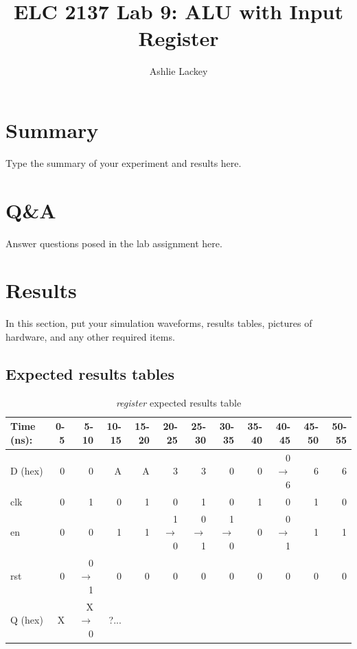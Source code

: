 \documentclass[11pt]{article}
\begin{document}
\title{ELC 2137 Lab 9: ALU with Input Register}
\author{Ashlie Lackey}

\maketitle


\section*{Summary}

Type the summary of your experiment and results here.  


\section*{Q\&A}

Answer questions posed in the lab assignment here.


\section*{Results}

In this section, put your simulation waveforms, results tables, pictures of hardware, and any other required items.

\subsection*{Expected results tables}
\begin{table}[ht]\centering
	\caption{\textit{register} expected results table}
	\label{ALU:tbl:register_ERT}\medskip
	\begin{tabular}{l|rrrrrrrrrrr}
		Time (ns): & 0-5 & 5-10 & 10-15 & 15-20 & 20-25 & 25-30 & 30-35 & 35-40& 40-45 & 45-50 & 50-55 \\
		\midrule
		D (hex) & 0 & 0     & A & A & 3         & 3       & 0           & 0 & 0$\to$6 & 6 & 6 \\
		clk     & 0 & 1     & 0 & 1 & 0         & 1       & 0           & 1 & 0   & 1 & 0 \\
		en    & 0 & 0       & 1 & 1 & 1$\to$0 & 0$\to$1 & 1$\to$0 & 0 & 0$\to$1& 1 & 1 \\
		rst   & 0 & 0$\to$1 & 0 & 0 & 0          & 0     & 0       & 0 & 0  & 0 & 0 \\
		\midrule
		Q (hex) & X & X$\to$0 & ?... &  &  &  & & & & & \\
		\bottomrule
	\end{tabular}
\end{table}
\end{document}
